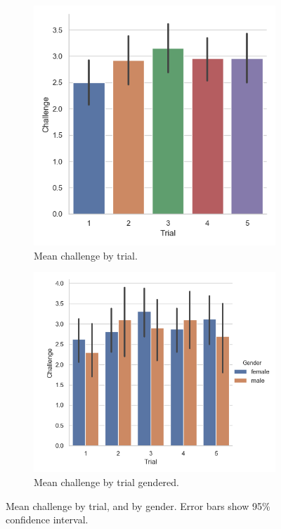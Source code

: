 \begin{figure}[H]
 \begin{subfigure}[b]{0.5\textwidth}
     \centering
     \includegraphics[scale=0.5]{Files/Plots/challenge_by_trial_mean.png}
     \caption{Mean challenge by trial.}
     \label{fig:meanChalTrial}
 \end{subfigure}
  \begin{subfigure}[b]{0.5\textwidth}
     \centering
     \includegraphics[scale=0.5]{Files/Plots/challenge_by_trial_median_gen.png}
     \caption{Mean challenge by trial gendered.}
     \label{fig:meanChalTrialGen}
 \end{subfigure}
     \caption{Mean challenge by trial, and by gender. Error bars show 95\%  confidence interval.}
    \label{fig:chalByTrial}
\end{figure}


